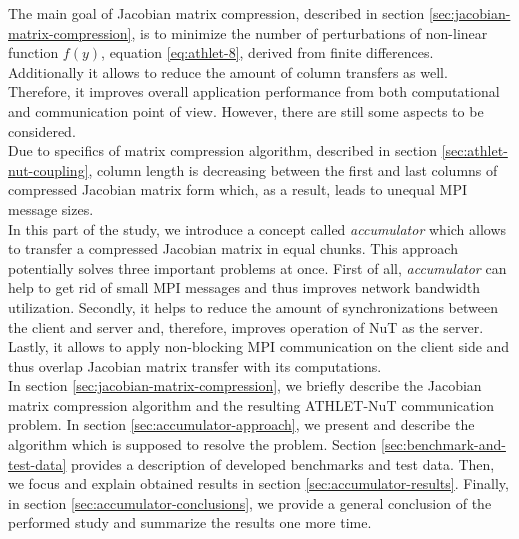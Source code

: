 The main goal of Jacobian matrix compression, described in section \ref{sec:jacobian-matrix-compression}, is to minimize the number of perturbations of non-linear function $f(y)$, equation \ref{eq:athlet-8}, derived from finite differences. Additionally it allows to reduce the amount of column transfers as well. Therefore, it improves overall application performance from both computational and communication point of view. However, there are still some aspects to be considered.\\


Due to specifics of matrix compression algorithm, described in section \ref{sec:athlet-nut-coupling}, column length is decreasing between the first and last columns of compressed Jacobian matrix form which, as a result, leads to unequal MPI message sizes.\\


In this part of the study, we introduce a concept called \textit{accumulator} which allows to transfer a compressed Jacobian matrix in equal chunks. This approach potentially solves three important problems at once. First of all, \textit{accumulator} can help to get rid of small MPI messages and thus improves network bandwidth utilization. Secondly, it helps to reduce the amount of synchronizations between the client and server and, therefore, improves operation of NuT as the server. Lastly, it allows to apply non-blocking MPI communication on the client side and thus overlap Jacobian matrix transfer with its computations.\\


In section \ref{sec:jacobian-matrix-compression}, we briefly describe the Jacobian matrix compression algorithm and the resulting ATHLET-NuT communication problem. In section \ref{sec:accumulator-approach}, we present and describe the algorithm which is supposed to resolve the problem. Section \ref{sec:benchmark-and-test-data} provides a description of developed benchmarks and test data. Then, we focus and explain obtained results in section \ref{sec:accumulator-results}. Finally, in section \ref{sec:accumulator-conclusions}, we provide a general conclusion of the performed study and summarize the results one more time.\\
